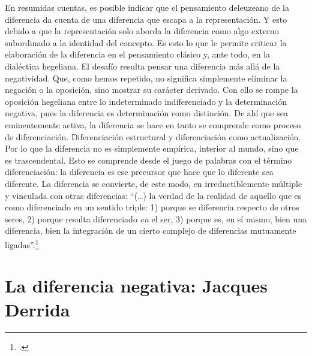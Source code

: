 En resumidas cuentas, es posible indicar que el pensamiento deleuzeano
de la diferencia da cuenta de una diferencia que escapa a la
representación. Y esto debido a que la representación solo aborda la
diferencia como algo externo subordinado a la identidad del concepto. Es
esto lo que le permite criticar la elaboración de la diferencia en el
pensamiento clásico y, ante todo, en la dialéctica hegeliana. El desafío
resulta pensar una diferencia más allá de la negatividad. Que, como
hemos repetido, no significa simplemente eliminar la negación o la
oposición, sino mostrar su carácter derivado. Con ello se rompe la
oposición hegeliana entre lo indeterminado indiferenciado y la
determinación negativa, pues la diferencia es determinación como
distinción. De ahí que sea eminentemente activa, la diferencia se hace
en tanto se comprende como proceso de diferenciación. Diferenciación
estructural y diferenciación como actualización. Por lo que la
diferencia no es simplemente empírica, interior al mundo, sino que es
trascendental. Esto se comprende desde el juego de palabras con el
término diferenciación: la diferencia es ese precursor que hace que lo
diferente sea diferente. La diferencia se convierte, de este modo, en
irreductiblemente múltiple y vinculada con otras diferencias:
\enquote{(\dots) la verdad de la realidad de aquello que es como
diferenciado en un sentido triple: 1) porque se diferencia respecto de
otros seres, 2) porque resulta diferenciado \emph{en} el ser, 3) porque
es, en sí mismo, bien una diferencia, bien la integración de un cierto
complejo de diferencias mutuamente ligadas}.\footcite[17]{gallego2008}

\section{La diferencia negativa: Jacques Derrida}

